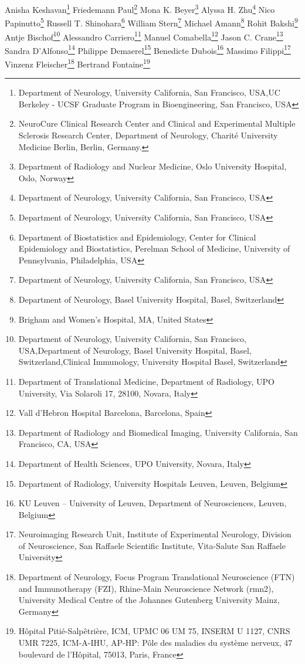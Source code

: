 \iflatexml
Anisha Keshavan\footnote[1,2]{Department of Neurology, University California, San Francisco,  USA,UC Berkeley - UCSF Graduate Program in Bioengineering, San Francisco, USA}
Friedemann Paul\footnote[3]{NeuroCure Clinical Research Center and Clinical and Experimental Multiple Sclerosis Research Center, Department of Neurology, Charité University Medicine Berlin, Berlin, Germany.}
Mona K. Beyer\footnote[4]{Department of Radiology and Nuclear Medicine, Oslo University Hospital, Oslo, Norway}
Alyssa H. Zhu\footnote[1]{Department of Neurology, University California, San Francisco,  USA}
Nico Papinutto\footnote[1]{Department of Neurology, University California, San Francisco,  USA}
Russell T. Shinohara\footnote[5]{Department of Biostatistics and Epidemiology, Center for Clinical Epidemiology and Biostatistics, Perelman School of Medicine, University of Pennsylvania, Philadelphia, USA}
William Stern\footnote[1]{Department of Neurology, University California, San Francisco,  USA}
Michael Amann\footnote[6]{Department of Neurology, Basel University Hospital, Basel, Switzerland}
Rohit Bakshi\footnote[7]{Brigham and Women's Hospital, MA, United States}
Antje Bischof\footnote[1,6,8]{Department of Neurology, University California, San Francisco,  USA,Department of Neurology, Basel University Hospital, Basel, Switzerland,Clinical Immunology, University Hospital Basel, Switzerland}
Alessandro Carriero\footnote[9]{Department of Translational Medicine, Department of Radiology,  UPO University, Via Solaroli 17, 28100, Novara, Italy}
Manuel Comabella\footnote[10]{Vall d’Hebron Hospital Barcelona, Barcelona, Spain}
Jason C. Crane\footnote[11]{Department of Radiology and Biomedical Imaging, University California, San Francisco, CA, USA}
Sandra D’Alfonso\footnote[12]{Department of Health Sciences, UPO University, Novara, Italy}
Philippe Demaerel\footnote[13]{Department of Radiology, University Hospitals Leuven, Leuven, Belgium}
Benedicte Dubois\footnote[14]{ KU Leuven – University of Leuven, Department of Neurosciences, Leuven, Belgium}
Massimo Filippi\footnote[15]{Neuroimaging Research Unit, Institute of Experimental Neurology, Division of Neuroscience, San Raffaele Scientific Institute, Vita-Salute San Raffaele University}
Vinzenz Fleischer\footnote[16]{Department of Neurology, Focus Program Translational Neuroscience (FTN) and Immunotherapy (FZI), Rhine-Main Neuroscience Network (rmn2), University Medical Centre of the Johannes Gutenberg University Mainz, Germany}
Bertrand Fontaine\footnote[17]{Hôpital Pitié-Salpêtrière, ICM, UPMC 06 UM 75, INSERM U 1127, CNRS UMR 7225, ICM-A-IHU, AP-HP: Pôle des maladies du système nerveux, 47 boulevard de l'Hôpital, 75013, Paris, France}
